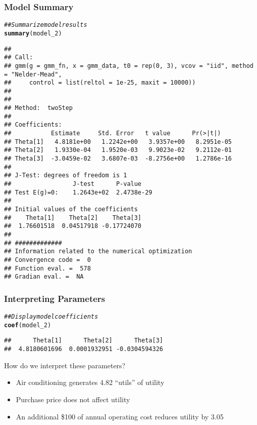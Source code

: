 \documentclass{beamer}\usepackage[]{graphicx}\usepackage[]{color}
\makeatletter
\newcommand{\hlcom}[1]{\textcolor[rgb]{0.678,0.584,0.686}{\textit{#1}}}%
\newcommand{\hlstd}[1]{\textcolor[rgb]{0.345,0.345,0.345}{#1}}%
\newcommand{\hlkwd}[1]{\textcolor[rgb]{0.737,0.353,0.396}{\textbf{#1}}}%
\newenvironment{kframe}{%
 \def\at@end@of@kframe{}%
 \ifinner\ifhmode%
  \def\at@end@of@kframe{\end{minipage}}%
  \begin{minipage}{\columnwidth}%
 \fi\fi%
 \def\FrameCommand##1{\hskip\@totalleftmargin \hskip-\fboxsep
 \colorbox{shadecolor}{##1}\hskip-\fboxsep
     \hskip-\linewidth \hskip-\@totalleftmargin \hskip\columnwidth}%
 \MakeFramed {\advance\hsize-\width
   \@totalleftmargin\z@ \linewidth\hsize
   \@setminipage}}%
 {\par\unskip\endMakeFramed%
 \at@end@of@kframe}
\newenvironment{knitrout}{}{} %
\makeatother
\begin{document}
\begin{frame}[fragile]\frametitle{Model Summary}
\begin{knitrout}\tiny
{}\color{fgcolor}\begin{kframe}
\begin{alltt}
\hlcom{## Summarize model results}
\hlkwd{summary}\hlstd{(model_2)}
\end{alltt}
\begin{verbatim}
## 
## Call:
## gmm(g = gmm_fn, x = gmm_data, t0 = rep(0, 3), vcov = "iid", method = "Nelder-Mead", 
##     control = list(reltol = 1e-25, maxit = 10000))
## 
## 
## Method:  twoStep 
## 
## Coefficients:
##           Estimate     Std. Error   t value      Pr(>|t|)   
## Theta[1]   4.8181e+00   1.2242e+00   3.9357e+00   8.2951e-05
## Theta[2]   1.9330e-04   1.9520e-03   9.9023e-02   9.2112e-01
## Theta[3]  -3.0459e-02   3.6807e-03  -8.2756e+00   1.2786e-16
## 
## J-Test: degrees of freedom is 1 
##                 J-test      P-value   
## Test E(g)=0:    1.2643e+02  2.4738e-29
## 
## Initial values of the coefficients
##    Theta[1]    Theta[2]    Theta[3] 
##  1.76601518  0.04517918 -0.17724070 
## 
## #############
## Information related to the numerical optimization
## Convergence code =  0 
## Function eval. =  578 
## Gradian eval. =  NA
\end{verbatim}
\end{kframe}
\end{knitrout}
\end{frame}

\begin{frame}[fragile]\frametitle{Interpreting Parameters}
\begin{knitrout}\footnotesize
{}\color{fgcolor}\begin{kframe}
\begin{alltt}
\hlcom{## Display model coefficients}
\hlkwd{coef}\hlstd{(model_2)}
\end{alltt}
\begin{verbatim}
##      Theta[1]      Theta[2]      Theta[3] 
##  4.8180601696  0.0001932951 -0.0304594326
\end{verbatim}
\end{kframe}
\end{knitrout}
    \vspace{2ex}
    How do we interpret these parameters?
    \begin{itemize}
        \item Air conditioning generates 4.82 ``utils'' of utility
        \item Purchase price does not affect utility
        \item An additional \$100 of annual operating cost reduces utility by 3.05
    \end{itemize}
\end{frame}
\end{document}
